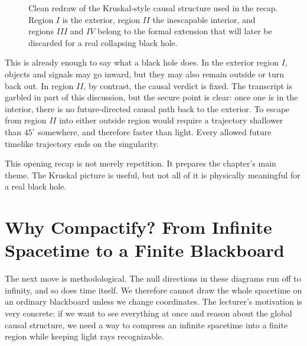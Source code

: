 \begin{figure}[htbp]
\centering
{}
\caption{Clean redraw of the Kruskal-style causal structure used in the recap. Region \(I\) is the exterior, region \(II\) the inescapable interior, and regions \(III\) and \(IV\) belong to the formal extension that will later be discarded for a real collapsing black hole.}
\end{figure}

This is already enough to say what a black hole does. In the exterior region \(I\), objects and signals may go inward, but they may also remain outside or turn back out. In region \(II\), by contrast, the causal verdict is fixed. The transcript is garbled in part of this discussion, but the secure point is clear: once one is in the interior, there is no future-directed causal path back to the exterior. To escape from region \(II\) into either outside region would require a trajectory shallower than \(45^\circ\) somewhere, and therefore faster than light. Every allowed future timelike trajectory ends on the singularity.

This opening recap is not merely repetition. It prepares the chapter's main theme. The Kruskal picture is useful, but not all of it is physically meaningful for a real black hole.

\section{Why Compactify? From Infinite Spacetime to a Finite Blackboard}

The next move is methodological. The null directions in these diagrams run off to infinity, and so does time itself. We therefore cannot draw the whole spacetime on an ordinary blackboard unless we change coordinates. The lecturer's motivation is very concrete: if we want to see everything at once and reason about the global causal structure, we need a way to compress an infinite spacetime into a finite region while keeping light rays recognizable.

